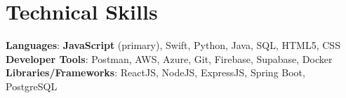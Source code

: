 \documentclass[letterpaper,11pt]{article}
\begin{document}
\section{Technical Skills}
 \begin{itemize}[leftmargin=0.15in, label={}]
    \small{\item{   
     \textbf{Languages}{: \textbf{JavaScript} (primary), Swift, Python, Java, SQL, HTML5, CSS} \\[1mm]
     \textbf{Developer Tools}{: Postman, AWS, Azure, Git, Firebase, Supabase, Docker} \\[1mm]
     \textbf{Libraries/Frameworks}{: ReactJS, NodeJS, ExpressJS, Spring Boot, PostgreSQL} \\ [1mm]
    }}
 \end{itemize}
\vspace{-16pt}
\end{document}
